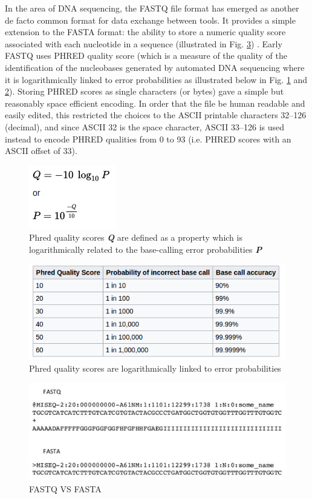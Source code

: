 \documentclass[12pt,openany]{llncs}
\begin{document}
In the area of DNA sequencing, the FASTQ file format has emerged as another de facto common format for data exchange between tools. It provides a simple extension to the FASTA format: the ability to store a numeric quality score associated with each nucleotide in a sequence (illustrated in Fig. \ref{fig:fig-NGS-6}) \cite{fasta-fastq2}. 
Early FASTQ uses PHRED quality score \cite{fasta-fastq0} (which is a measure of the quality of the identification of the nucleobases generated by automated DNA sequencing where it is logarithmically linked to error probabilities as illustrated below in Fig. \ref{fig:fig-NGS-3} and \ref{fig:fig-NGS-4}). Storing PHRED scores as single characters (or bytes) gave a simple but reasonably space efficient encoding. In order that the file be human readable and easily edited, this restricted the choices to the ASCII printable characters 32–126 (decimal), and since ASCII 32 is the space character, ASCII 33–126 is used instead to encode PHRED qualities from 0 to 93 (i.e. PHRED scores with an ASCII offset of 33).


\begin{figure}
	\centering
	\includegraphics{./figs/NGS-3}
	\caption{\label{fig:fig-NGS-3}Phred quality scores 
	\textit{\textbf{Q}} are defined as a property which is logarithmically related to the base-calling error probabilities \textit{\textbf{P}}}
\end{figure}
\begin{figure}
	\centering
	\includegraphics[width=.911\linewidth]{./figs/NGS-4}
	\caption{\label{fig:fig-NGS-4}Phred quality scores are logarithmically linked to error probabilities}
\end{figure}

\begin{figure}
	\centering
	\includegraphics[width=.911\linewidth]{./figs/NGS-6}
	\caption{\label{fig:fig-NGS-6}FASTQ VS FASTA}
\end{figure}
\end{document}
